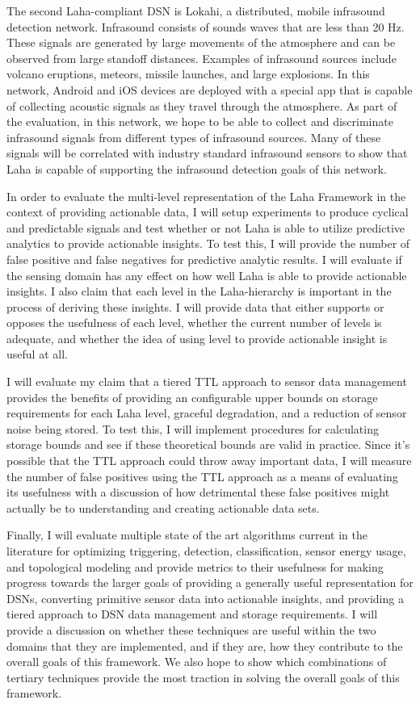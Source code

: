 The second Laha-compliant DSN is Lokahi, a distributed, mobile infrasound detection network. Infrasound consists of sounds waves that are less than 20 Hz. These signals are generated by large movements of the atmosphere and can be observed from large standoff distances. Examples of infrasound sources include volcano eruptions, meteors, missile launches, and large explosions. In this network, Android and iOS devices are deployed with a special app that is capable of collecting acoustic signals as they travel through the atmosphere. As part of the evaluation, in this network, we hope to be able to collect and discriminate infrasound signals from different types of infrasound sources. Many of these signals will be correlated with industry standard infrasound sensors to show that Laha is capable of supporting the infrasound detection goals of this network.

In order to evaluate the multi-level representation of the Laha Framework in the context of providing actionable data, I will setup experiments to produce cyclical and predictable signals and test whether or not Laha is able to utilize predictive analytics to provide actionable insights. To test this, I will provide the number of false positive and false negatives for predictive analytic results. I will evaluate if the sensing domain has any effect on how well Laha is able to provide actionable insights. I also claim that each level in the Laha-hierarchy is important in the process of deriving these insights. I will provide data that either supports or opposes the usefulness of each level, whether the current number of levels is adequate, and whether the idea of using level to provide actionable insight is useful at all.

I will evaluate my claim that a tiered TTL approach to sensor data management provides the benefits of providing an configurable upper bounds on storage requirements for each Laha level, graceful degradation, and a reduction of sensor noise being stored. To test this, I will implement procedures for calculating storage bounds and see if these theoretical bounds are valid in practice. Since it's possible that the TTL approach could throw away important data, I will measure the number of false positives using the TTL approach as a means of evaluating its usefulness with a discussion of how detrimental these false positives might actually be to understanding and creating actionable data sets.

Finally, I will evaluate multiple state of the art algorithms current in the literature for optimizing triggering, detection, classification, sensor energy usage, and topological modeling and provide metrics to their usefulness for making progress towards the larger goals of providing a generally useful representation for DSNs, converting primitive sensor data into actionable insights, and providing a tiered approach to DSN data management and storage requirements. I will provide a discussion on whether these techniques are useful within the two domains that they are implemented, and if they are, how they contribute to the overall goals of this framework. We also hope to show which combinations of tertiary techniques provide the most traction in solving the overall goals of this framework.

